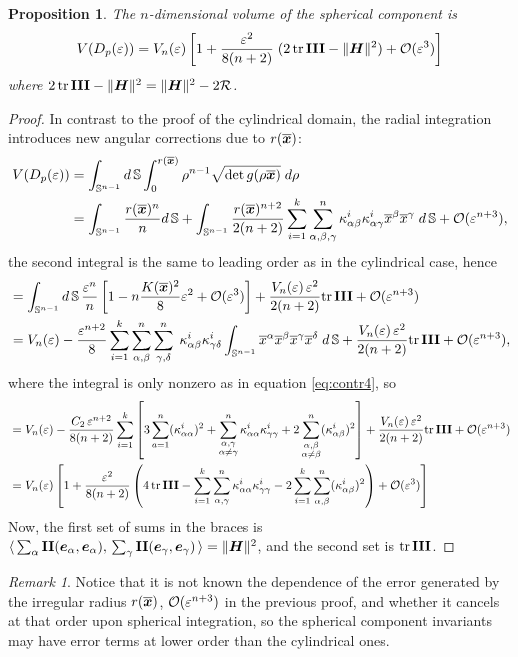\documentclass[letterpaper, reqno, 11pt]{amsart}
\newtheorem{proposition}[theorem]{Proposition}
\theoremstyle{definition}
\theoremstyle{remark}
\newtheorem{remark}[theorem]{Remark}
\numberwithin{equation}{section}
\begin{document}
\begin{proposition}
	The $n$-dimensional volume of the spherical component is
\begin{equation}
	V(D_p(\varepsilon)) = V_n(\varepsilon)\left[ 1+\frac{\varepsilon^2}{8(n+2)}\;(2\,\mathrm{tr}\,\boldsymbol{\mathrm{III}}-\|\boldsymbol{H}\|^2) +{\mathcal O}(\varepsilon^3) \right]
\end{equation}
where $2\,\mathrm{tr}\,\boldsymbol{\mathrm{III}}-\|\boldsymbol{H}\|^2=\|\boldsymbol{H}\|^2-2\mathcal{R}$.
\end{proposition}
\begin{proof}
In contrast to the proof of the cylindrical domain, the radial integration introduces new angular corrections due to $r(\boldsymbol{\overline{x}})$:
\begin{align*}
	V(D_p(\varepsilon)) & = \int_{{\mathbb S}^{n-1}}d\,{\mathbb S}\int^{r(\boldsymbol{\overline{x}})}_0 \rho^{n-1}\sqrt{\det g(\rho\boldsymbol{\overline{x}})}\; d\rho \\
	& = \int_{{\mathbb S}^{n-1}}\frac{r(\boldsymbol{\overline{x}})^n}{n}d\,{\mathbb S} + \int_{{\mathbb S}^{n-1}}\frac{r(\boldsymbol{\overline{x}})^{n+2}}{2(n+2)}\sum_{i=1}^k\sum_{\alpha,\beta,\gamma}^n\kappa^i_{\alpha\beta}\kappa^i_{\alpha\gamma}\overline{x}^\beta\overline{x}^\gamma\;d\,{\mathbb S} + {\mathcal O}(\varepsilon^{n+3}),
\end{align*}
the second integral is the same to leading order as in the cylindrical case, hence
\begin{align*}
	& = \int_{{\mathbb S}^{n-1}}d\,{\mathbb S}\,\frac{\varepsilon^n}{n}\left[ 1-n\frac{K(\boldsymbol{\overline{x}})^2}{8}\varepsilon^2 +{\mathcal O}(\varepsilon^3)\right] + \frac{V_n(\varepsilon)\,\varepsilon^2}{2(n+2)}\mathrm{tr}\,\boldsymbol{\mathrm{III}}  + {\mathcal O}(\varepsilon^{n+3}) \\
	& = V_n(\varepsilon) -\frac{\varepsilon^{n+2}}{8}\sum_{i=1}^k\sum^n_{\alpha,\beta}\sum^n_{\gamma,\delta}\;\kappa^i_{\alpha\beta}\kappa^i_{\gamma\delta}\int_{{\mathbb S}^{n-1}}\overline{x}^\alpha\overline{x}^\beta\overline{x}^\gamma\overline{x}^\delta \; d\,{\mathbb S}  + \frac{V_n(\varepsilon)\,\varepsilon^2}{2(n+2)}\mathrm{tr}\,\boldsymbol{\mathrm{III}}  + {\mathcal O}(\varepsilon^{n+3}),
\end{align*}
where the integral is only nonzero as in equation \ref{eq:contr4}, so 
\begin{align*}
	& = V_n(\varepsilon) -\frac{C_2\,\varepsilon^{n+2}}{8(n+2)}\sum_{i=1}^k\left[3\sum_{a=1}^n(\kappa^i_{\alpha\alpha})^2 +\sum^n_{\substack{\alpha,\gamma \\ \alpha\neq\gamma}}\kappa^i_{\alpha\alpha}\kappa^i_{\gamma\gamma} + 2\sum^n_{\substack{\alpha,\beta \\ \alpha\neq\beta}}(\kappa^i_{\alpha\beta})^2 \right] + \frac{V_n(\varepsilon)\,\varepsilon^2}{2(n+2)}\mathrm{tr}\,\boldsymbol{\mathrm{III}}  + {\mathcal O}(\varepsilon^{n+3}) \\
	& = V_n(\varepsilon)\left[1 +\frac{\varepsilon^{2}}{8(n+2)}\left(4\,\mathrm{tr}\,\boldsymbol{\mathrm{III}} -\sum_{i=1}^k\sum^n_{\alpha,\gamma}\kappa^i_{\alpha\alpha}\kappa^i_{\gamma\gamma} - 2\sum_{i=1}^k\sum^n_{\alpha,\beta}(\kappa^i_{\alpha\beta})^2 \right) + {\mathcal O}(\varepsilon^3)\right]
\end{align*}
Now, the first set of sums in the braces is $\langle\, {\sum_\alpha\boldsymbol{\mathrm{II}}(\boldsymbol{e}_\alpha,\boldsymbol{e}_\alpha)},\,{\sum_\gamma\boldsymbol{\mathrm{II}}(\boldsymbol{e}_\gamma,\boldsymbol{e}_\gamma)}\,\rangle =\|\boldsymbol{H}\|^2$, and the second set is $\mathrm{tr}\,\boldsymbol{\mathrm{III}}$.
\end{proof}
\begin{remark}
	Notice that it is not known the dependence of the error generated by the irregular radius $r(\boldsymbol{\overline{x}})$, ${\mathcal O}(\varepsilon^{n+3})$ in the previous proof, and whether it cancels at that order upon spherical integration, so the spherical component invariants may have error terms at lower order than the cylindrical ones.
\end{remark}
\end{document}
